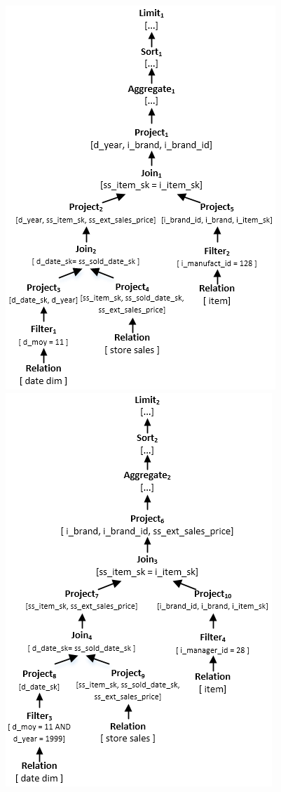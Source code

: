 \begin{figure}[htbp]
   \centering
   \includegraphics[scale=0.5]{figures/q3}
   \includegraphics[scale=0.5]{figures/q55}

\end{figure}
